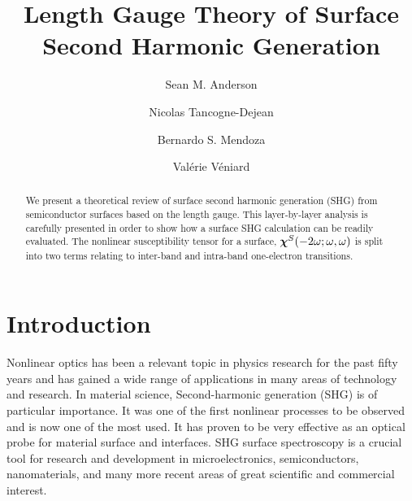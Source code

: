 \documentclass[floatfix,prb,aps,superscriptaddress,11pt,preprint,letterpaper]{revtex4}
\def\chon{red}
\begin{document}
\title{Length Gauge Theory of Surface Second Harmonic Generation}
\author{Sean M. Anderson}
\author{Nicolas Tancogne-Dejean}
\author{Bernardo S. Mendoza}
\author{Val\'erie V\'eniard}

\begin{abstract}
We present a theoretical review of surface second harmonic generation (SHG) 
from semiconductor surfaces based on the {\color{\chon} length} gauge. This 
layer-by-layer analysis is carefully presented in order to show how a 
surface SHG calculation can be readily evaluated. The nonlinear susceptibility 
tensor for a surface, $\boldsymbol{\chi}^S(-2\omega;\omega,\omega)$
is split into two terms relating to inter-band 
and intra-band one-electron transitions. 

\end{abstract}  

\maketitle

\section{Introduction}\label{intro}

Nonlinear optics has been a relevant topic in physics research for the past 
fifty years and has gained a wide range of applications in 
many areas of technology and research. In material science,
Second-harmonic generation (SHG) is of particular importance.
It was one of the first nonlinear processes to be observed and is now one
of the most used. It has proven to be very effective as an 
optical probe for material surface and interfaces. 
\cite{hughesPRB96, 
     guyot-sionnestPRB88, 
     lupkeSSR99, 
     downerPSSA01, 
     shenAPB99, 
     shenNAT89, 
     chenPRL81, 
     maytorenaPRB98}
SHG surface spectroscopy is a crucial tool for research and development
in microelectronics, semiconductors, nanomaterials, and many more recent 
areas of great scientific and commercial interest.
\end{document}
